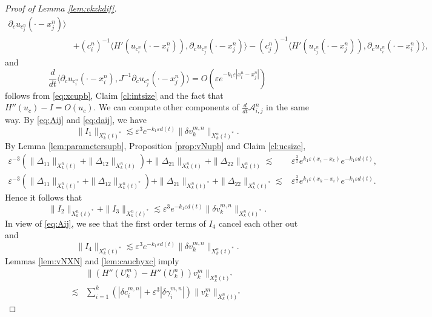 \documentclass[11pt]{amsart}
\theoremstyle{remark}
\numberwithin{equation}{section}
\begin{document}
\begin{proof}[Proof of Lemma \ref{lem:vkxkdif}]
\begin{align*}
{\partial}_cu_{c_j^n}(\cdot-x_j^n){\rangle}
\\ & +(c_i^n)^{-1}{\langle} H'(u_{c_i^n}(\cdot-x_i^n)),{\partial}_cu_{c_j^n}(\cdot-x_j^n){\rangle}
-(c_j^n)^{-1}{\langle} H'(u_{c_j^n}(\cdot-x_j^n)),{\partial}_cu_{c_i^n}(\cdot-x_i^n){\rangle},
\end{align*}
and
$$\frac{d}{dt}{\langle} {\partial}_cu_{c_i^n}(\cdot-x_i^n),J^{-1}{\partial}_cu_{c_j^n}(\cdot-x_j^n){\rangle}
=O({\varepsilon} e^{-k_1{\varepsilon}|x_i^n-x_j^n|})$$
follows from \eqref{eq:xcupb}, Claim \ref{cl:intsize} and the fact that
$H''(u_c)-I=O(u_c)$.
We can compute other components of $\frac{d}{dt}\mathcal{A}_{i,j}^n$
in the same way.
By \eqref{eq:Aij} and \eqref{eq:daij}, we have
\begin{equation}
  \label{eq:vci1}
\|I_1\|_{X_k^n(t)^*} \lesssim {\varepsilon}^3e^{-k_1{\varepsilon} d(t)}\|{\delta v}_k^{m,n}\|_{X_k^n(t)^*}.
\end{equation}
By Lemma \ref{lem:parametersupb}, Proposition \ref{prop:vNupb} and
Claim \ref{cl:ucsize},
\begin{align*}
{\varepsilon}^{-3}(\|\Delta_{11}\|_{X_k^n(t)}+\|\Delta_{12}\|_{X_k^n(t)})
+\|\Delta_{21}\|_{X_k^n(t)}+\|\Delta_{22}\|_{X_k^n(t)}
\lesssim &  {\varepsilon}^{\frac32}e^{k_1{\varepsilon}(x_i-x_k)}e^{-k_1{\varepsilon} d(t)},
\\ {\varepsilon}^{-3}(\|\Delta_{11}\|_{X_k^n(t)^*}+\|\Delta_{12}\|_{X_k^n(t)^*})
+\|\Delta_{21}\|_{X_k^n(t)^*}+\|\Delta_{22}\|_{X_k^n(t)^*} \lesssim &
{\varepsilon}^{\frac32}e^{k_1{\varepsilon}(x_k-x_i)}e^{-k_1{\varepsilon} d(t)}.
\end{align*}
Hence it follows that
\begin{equation}
  \label{eq:vxi2}
  \|I_2\|_{X_k^n(t)^*}+\|I_3\|_{X_k^n(t)^*}
\lesssim {\varepsilon}^3e^{-k_1{\varepsilon} d(t)}\|{\delta v}_k^{m,n}\|_{X_k^n(t)^*}.
\end{equation}
In view of \eqref{eq:Aij}, we see that the first order terms of $I_4$ cancel
each other out and
\begin{equation}
  \label{eq:vxi3}
  \|I_4\|_{X_k^n(t)^*} \lesssim {\varepsilon}^3e^{-k_1{\varepsilon} d(t)}\|{\delta v}_k^{m,n}\|_{X_k^n(t)^*}.
\end{equation}
Lemmas \ref{lem:vNXN} and \ref{lem:cauchyxc} imply
\begin{equation}
  \label{eq:xcII}
  \begin{split}
& \|(H''(U_k^m)-H''(U_k^n))v_k^m\|_{X_k^n(t)^*} \\ \lesssim
& \sum_{i=1}^k(|{\delta c}^{m,n}_i|+{\varepsilon}^3|{\delta\gamma}^{m,n}_i|) \|v_k^m\|_{X_k^n(t)^*}

\end{split}
\end{equation}
\end{proof}
\end{document}
